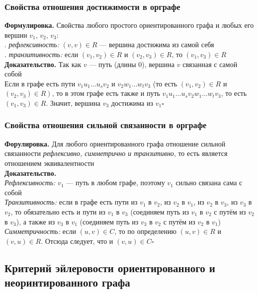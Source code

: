 \documentclass[a4paper]{article}
\newcommand{\qed}{\hfill$\square$}
\begin{document}
\subsubsection*{Свойства отношения достижимости в орграфе}
\textbf{Формулировка.} Свойства любого простого ориентированного графа и любых его вершин $v_1$, $v_2$, $v_3$:\\[2mm]
. \textit{рефлексивность:} $(v,v)\in R$ — вершина достижима из самой себя\\[2mm]
. \textit{транзитивность:} если $(v_1,v_2)\in R$ и $(v_2,v_3)\in R$, то $(v_1,v_3)\in R$\\[2mm]
\indent\textbf{Доказательство.} Так как $v$ — путь (длины 0), вершина $v$ связанная с самой собой\\[2mm]
\indent Если в графе есть пути $v_{1} u_{1} \ldots u_{s} v_{2}$ и $v_{2} w_{1} \ldots w_{t} v_{3}$ (то есть $\left(v_{1}, v_{2}\right) \in R$ и $\left.\left(v_{2}, v_{3}\right) \in R\right)$, то в этом графе есть также и путь $v_{1} u_{1} \ldots u_{s} v_{2} w_{1} \ldots w_{t} v_{3}$, то есть $\left(v_{1}, v_{3}\right) \in R$. Значит, вершина $v_{3}$ достижима из $v_{1}$\qed
\label{2.19}

\subsubsection*{Свойства отношения сильной связанности в орграфе}
\textbf{Форулировка.} Для любого ориентированного графа отношение сильной связанности \textit{рефлексивно, симметрично и транзитивно}, то есть является отношением эквивалентности\\[2mm]
\indent\textbf{Доказательство.}\\[2mm]
\indent\textit{Рефлексивность:} $v_1$ — путь в любом графе, поэтому $v_1$ сильно связана сама с собой\\[2mm]
\indent\textit{Транзитивность:} если в графе есть пути из $v_1$ в $v_2$, из $v_2$ в $v_1$, из $v_2$ в $v_3$, из $v_3$ в $v_2$, то обязательно есть и пути из $v_1$ в $v_3$ (соединяем путь из $v_1$ в $v_2$ с путём из $v_2$ в $v_3$), а также из $v_3$ в $v_1$ (соединяем путь из $v_3$ в $v_2$ с путём из $v_2$ в $v_1$)\\[2mm]
\indent\textit{Симметричность:} если $(u, v) \in C$, то по определению $(u, v) \in R$ и $(v, u) \in R$. Отсюда следует, что и $(v, u) \in C$\qed

\subsection{Критерий эйлеровости ориентированного и неоринтированного графа}
\end{document}
